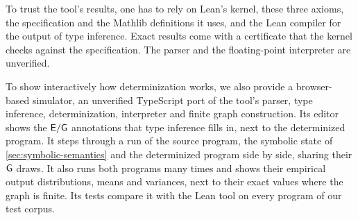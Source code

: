 To trust the tool's results, one has to rely on Lean's kernel, these three axioms, the specification and the Mathlib definitions it uses, and the Lean compiler for the output of type inference. Exact results come with a certificate that the kernel checks against the specification. The parser and the floating-point interpreter are unverified.

To show interactively how determinization works, we also provide a browser-based simulator, an unverified TypeScript port of the tool's parser, type inference, determinization, interpreter and finite graph construction. Its editor shows the $\mathsf{E}/\mathsf{G}$ annotations that type inference fills in, next to the determinized program. It steps through a run of the source program, the symbolic state of \cref{sec:symbolic-semantics} and the determinized program side by side, sharing their $\mathsf{G}$ draws. It also runs both programs many times and shows their empirical output distributions, means and variances, next to their exact values where the graph is finite. Its tests compare it with the Lean tool on every program of our test corpus.

